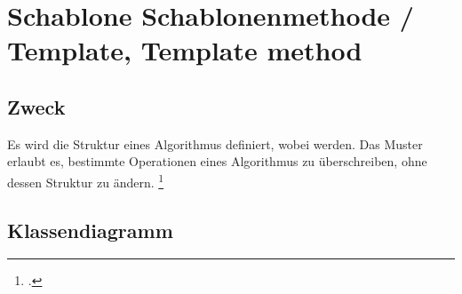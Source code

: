 \documentclass{lehramt-informatik-haupt}
\begin{document}

\chapter{Schablone Schablonenmethode / Template, Template method}

\begin{quellen}
\item \cite{wiki:schablone}
\item \cite[Seite 274-278]{gof}
\item \cite[Seite 68 - 70]{eilebrecht}
\end{quellen}

%

\section{Zweck}

Es wird die Struktur eines Algorithmus definiert, wobei  werden. Das Muster erlaubt
es, bestimmte Operationen eines Algorithmus zu überschreiben, ohne
dessen Struktur zu ändern.
\footcite[Seite 68]{eilebrecht}

%

\section{Klassendiagramm}

\end{document}
